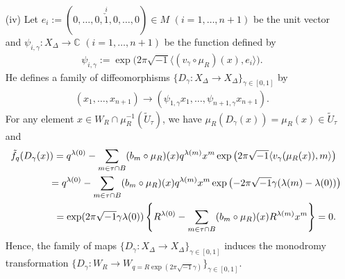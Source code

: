\documentclass[pdftex]{sigma}
\numberwithin{equation}{section}
\begin{document}
\begin{enumerate}
The region surrounded by the center part of the tropical hypersurface coincides with
\begin{gather*}
\big\{ n \in N_{\mathbb R} \,|\, \lambda(0) \geq \langle m, n \rangle + \lambda(m) \ \mathrm{for\ any\ vertex} \ m \ \mathrm{in} \ T \big\}.
\end{gather*}
Hence when we set $\gamma=1$, the boundary of the convex polytope $\Delta_{\gamma=1}^\vee$ coincides with the center part of the tropical hypersurface.
For each $k$-dimensional simplex $\tau \in \partial T$, we def\/ine an $(n-k)$-dimensional face $\tau^\vee$ of $\Delta_\gamma^\vee$ by
\begin{gather*}
\tau^\vee:=\big\{ n \in \Delta_\gamma^\vee \,|\, {-}\langle n, m \rangle = \gamma (\lambda(m) - \lambda(0)) \ \mathrm{for\ any\ vertex} \ m \ \mathrm{in} \ \tau \big\}.
\end{gather*}
There is a bijective correspondence between simplices in~$\partial T$ and faces of $\Delta_\gamma^\vee$ given by $\tau \leftrightarrow \tau^\vee$.
Then he constructs a family of maps $\{v_\gamma \colon \Delta^\circ \to \partial \Delta_\gamma^\vee \}_{\gamma \in [0,1]}$ which depends on~$\gamma$ smoothly and satisf\/ies $v_\gamma(\widetilde{U}_\tau) \subset \tau^\vee$ for any $\tau \in \partial T$.

\item[(iv)]
Let $e_i:=(0,\dots,0,\overset{i}{\check{1}},0,\dots,0) \in M$ $(i=1, \dots, n+1)$ be the unit vector
and $\psi_{i,\gamma} \colon X_\Delta \to {\mathbb C}$ $(i=1, \dots, n+1)$ be the function def\/ined by
\begin{gather*}
\psi_{i,\gamma}:=\exp \big( 2 \pi \sqrt{-1} \langle (v_\gamma \circ \mu_R )(x), e_i \rangle \big).
\end{gather*}
He def\/ines a family of dif\/feomorphisms $\{ D_\gamma \colon X_\Delta \to X_\Delta \}_{\gamma \in [0,1]}$ by
\begin{gather}\label{eq:d1}
(x_{1}, \dots, x_{n+1}) \to (\psi_{1,\gamma} x_1, \dots, \psi_{n+1,\gamma} x_{n+1}).
\end{gather}
For any element $x \in W_R \cap \mu_R^{-1}(\widetilde{U}_\tau)$, we have $\mu_R(D_\gamma(x))=\mu_R(x) \in \widetilde{U}_\tau$ and
\begin{gather*}
\tilde{f}_q(D_\gamma(x)) =q^{\lambda(0)}-\sum_{m \in \tau \cap B}(b_m \circ \mu_R)(x)q^{\lambda(m)}x^m \exp \big( 2 \pi \sqrt{-1} \langle v_\gamma (\mu_R(x)), m\rangle \big) \\
\hphantom{\tilde{f}_q(D_\gamma(x))}{}
=q^{\lambda(0)}-\sum_{m \in \tau \cap B}(b_m \circ \mu_R)(x)q^{\lambda(m)}x^m \exp \big( {-}2 \pi \sqrt{-1} \gamma ( \lambda(m) - \lambda(0)) \big)\\
\hphantom{\tilde{f}_q(D_\gamma(x))}{}
 =\exp(2 \pi \sqrt{-1} \gamma \lambda(0)) \left\{ R^{\lambda(0)}-\sum_{m \in \tau \cap B}(b_m \circ \mu_R)(x)R^{\lambda(m)}{x}^m \right\}=0 .
\end{gather*}
Hence, the family of maps $\{D_\gamma \colon X_\Delta \to X_\Delta \}_{\gamma \in [0,1]}$ induces the monodromy transformation $\big\{ D_\gamma \colon W_R \to W_{q=R\exp (2 \pi \sqrt{-1} \gamma)} \big\}_{\gamma \in [0,1]}$.
\end{enumerate}
\end{document}
